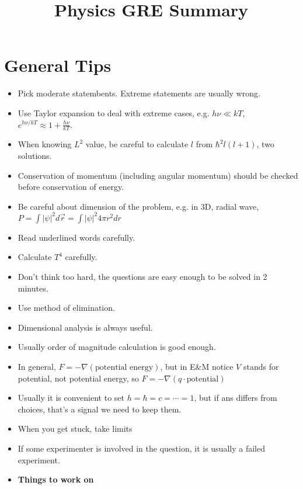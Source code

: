 \documentclass[english]{article}
\begin{document}
\title{Physics GRE Summary}

\maketitle

\section*{General Tips}
\begin{itemize}
\item Pick moderate statembents. Extreme statements are usually wrong.
\item Use Taylor expansion to deal with extreme cases, e.g. $h\nu\ll kT$,
$e^{h\nu/kT}\approx1+\frac{h\nu}{kT}$.
\item When knowing $L^{2}$ value, be careful to calculate $l$ from $\hbar^{2}l(l+1)$,
two solutions.
\item Conservation of momentum (including angular momentum) should be checked
before conservation of energy.
\item Be careful about dimension of the problem, e.g. in 3D, radial wave,
$P=\int|\psi|^{2}d\vec{r}=\int|\psi|^{2}4\pi r^{2}dr$
\item Read underlined words carefully.
\item Calculate $T^{4}$ carefully.
\item Don't think too hard, the questions are easy enough to be solved in
2 minutes.
\item Use method of elimination.
\item Dimensional analysis is always useful.
\item Usually order of magnitude calculation is good enough.
\item In general, $F=-\nabla(\text{potential energy})$, but in E\&M notice
$V$ stands for potential, not potential energy, so $F=-\nabla(q\cdot\text{potential})$
\item Usually it is convenient to set $h=\hbar=c=\cdots=1$, but if ans
differs from choices, that's a signal we need to keep them.
\item When you get stuck, take limits
\item If some experimenter is involved in the question, it is usually a
failed experiment.
\item \textbf{Things to work on}

\end{itemize}
\end{document}
